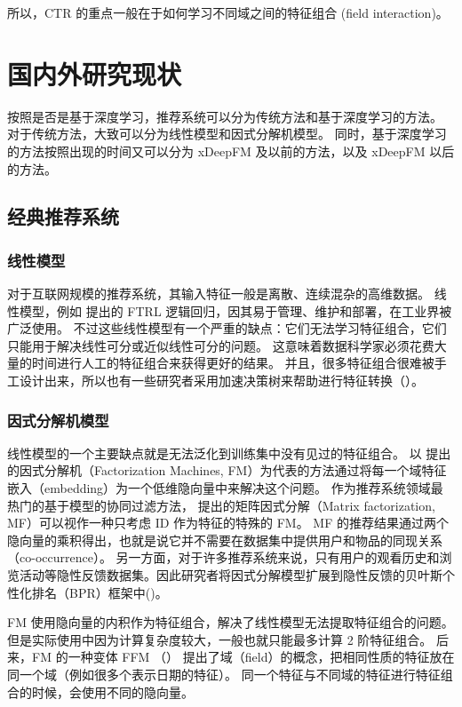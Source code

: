 \documentclass[degree=master,cjk-font=noto]{thuthesis}
\begin{document}
所以，CTR 的重点一般在于如何学习不同域之间的特征组合 (field interaction)。

\chapter{国内外研究现状}

按照是否是基于深度学习，推荐系统可以分为传统方法和基于深度学习的方法。
对于传统方法，大致可以分为线性模型和因式分解机模型。
同时，基于深度学习的方法按照出现的时间又可以分为 xDeepFM 及以前的方法，以及 xDeepFM 以后的方法。

\section{经典推荐系统}

\subsection{线性模型}

对于互联网规模的推荐系统，其输入特征一般是离散、连续混杂的高维数据。
线性模型，例如 \cite{tfrl} 提出的 FTRL 逻辑回归，因其易于管理、维护和部署，在工业界被广泛使用。
不过这些线性模型有一个严重的缺点：它们无法学习特征组合，它们只能用于解决线性可分或近似线性可分的问题。
这意味着数据科学家必须花费大量的时间进行人工的特征组合来获得更好的结果。
并且，很多特征组合很难被手工设计出来，所以也有一些研究者采用加速决策树来帮助进行特征转换（\cite{ctr_bing}）。

\subsection{因式分解机模型}

线性模型的一个主要缺点就是无法泛化到训练集中没有见过的特征组合。
以 \cite{fm} 提出的因式分解机（Factorization Machines, FM）为代表的方法通过将每一个域特征嵌入（embedding）为一个低维隐向量中来解决这个问题。
作为推荐系统领域最热门的基于模型的协同过滤方法，\cite{mf} 提出的矩阵因式分解（Matrix factorization, MF）可以视作一种只考虑 ID 作为特征的特殊的 FM。
MF 的推荐结果通过两个隐向量的乘积得出，也就是说它并不需要在数据集中提供用户和物品的同现关系（co-occurrence）。
另一方面，对于许多推荐系统来说，只有用户的观看历史和浏览活动等隐性反馈数据集。因此研究者将因式分解模型扩展到隐性反馈的贝叶斯个性化排名（BPR）框架中(\cite{vbpr})。

FM 使用隐向量的内积作为特征组合，解决了线性模型无法提取特征组合的问题。
但是实际使用中因为计算复杂度较大，一般也就只能最多计算 2 阶特征组合。
后来，FM 的一种变体 FFM （\cite{ffm}） 提出了域（field）的概念，把相同性质的特征放在同一个域（例如很多个表示日期的特征）。
同一个特征与不同域的特征进行特征组合的时候，会使用不同的隐向量。
\end{document}
